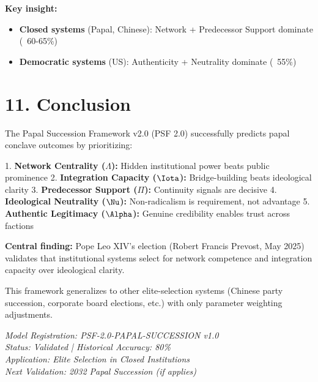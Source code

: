 \documentclass[11pt]{article}
\begin{document}
\textbf{Key insight:}
\begin{itemize}
\item \textbf{Closed systems} (Papal, Chinese): Network + Predecessor Support dominate (~60-65\%)
\item \textbf{Democratic systems} (US): Authenticity + Neutrality dominate (~55\%)
\end{itemize}

\section{11. Conclusion}

The Papal Succession Framework v2.0 (PSF 2.0) successfully predicts papal conclave outcomes by prioritizing:

1. \textbf{Network Centrality ($\Lambda$):} Hidden institutional power beats public prominence
2. \textbf{Integration Capacity ($\Iota$):} Bridge-building beats ideological clarity
3. \textbf{Predecessor Support ($\Pi$):} Continuity signals are decisive
4. \textbf{Ideological Neutrality ($\Nu$):} Non-radicalism is requirement, not advantage
5. \textbf{Authentic Legitimacy ($\Alpha$):} Genuine credibility enables trust across factions

\textbf{Central finding:} Pope Leo XIV's election (Robert Francis Prevost, May 2025) validates that institutional systems select for network competence and integration capacity over ideological clarity.

This framework generalizes to other elite-selection systems (Chinese party succession, corporate board elections, etc.) with only parameter weighting adjustments.

\vspace{2cm}

\begin{center}
\textit{Model Registration: PSF-2.0-PAPAL-SUCCESSION v1.0} \\
\textit{Status: Validated | Historical Accuracy: 80\%} \\
\textit{Application: Elite Selection in Closed Institutions} \\
\textit{Next Validation: 2032 Papal Succession (if applies)}
\end{center}
\end{document}
